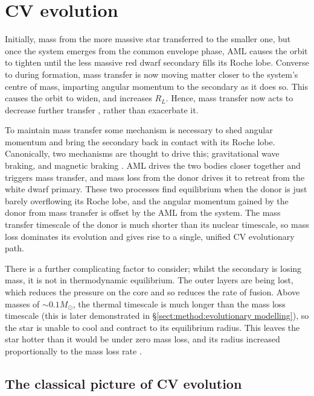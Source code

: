 \section{CV evolution}
\label{sect:introduction:Summary of how AML and Mdot drive period evolution}

Initially, mass from the more massive star transferred to the smaller one, but once the system emerges from the common envelope phase, AML causes the orbit to tighten until the less massive red dwarf secondary fills its Roche lobe. Converse to during formation, mass transfer is now moving matter closer to the system's centre of mass, imparting angular momentum to the secondary as it does so. This causes the orbit to widen, and increases $R_L$. Hence, mass transfer now acts to decrease further transfer \citep{Ritter2008}, rather than exacerbate it.

To maintain mass transfer some mechanism is necessary to shed angular momentum and bring the secondary back in contact with its Roche lobe. 
Canonically, two mechanisms are thought to drive this; gravitational wave braking, and magnetic braking \citep{knigge2006,knigge11}.
AML drives the two bodies closer together and triggers mass transfer, and mass loss from the donor drives it to retreat from the white dwarf primary. These two processes find equilibrium when the donor is just barely overflowing its Roche lobe, and the angular momentum gained by the donor from mass transfer is offset by the AML from the system.
The mass transfer timescale of the donor is much shorter than its nuclear timescale, so mass loss dominates its evolution and gives rise to a single, unified CV evolutionary path.

There is a further complicating factor to consider; whilst the secondary is losing mass, it is not in thermodynamic equilibrium. The outer layers are being lost, which reduces the pressure on the core and so reduces the rate of fusion. 
Above masses of $\sim 0.1 M_\odot$, the thermal timescale is much longer than the mass loss timescale (this is later demonstrated in \S\ref{sect:method:evolutionary modelling}), so the star is unable to cool and contract to its equilibrium radius. This leaves the star hotter than it would be under zero mass loss, and its radius increased proportionally to the mass loss rate \citep{knigge2006, knigge11}.


\subsection{The classical picture of CV evolution}
\label{sect:introduction:AMLMechs}

